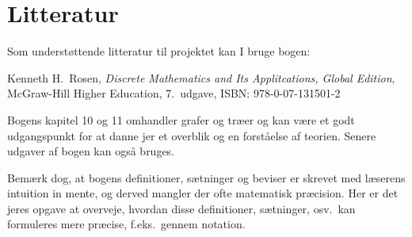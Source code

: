 \section{Litteratur}
\label{sec:literature}
Som understøttende litteratur til projektet kan I bruge bogen:
\begin{center}
  Kenneth H.\ Rosen,
  \emph{Discrete Mathematics and Its Applitcations, Global Edition},\\
  McGraw-Hill Higher Education,
  7.\ udgave,
  ISBN: 978-0-07-131501-2
\end{center}
Bogens kapitel 10 og 11 omhandler grafer og træer og kan være et godt udgangspunkt for at danne jer et overblik og en forståelse af teorien.
Senere udgaver af bogen kan også bruges.

Bemærk dog, at bogens definitioner, sætninger og beviser er skrevet med læserens intuition in mente, og derved mangler der ofte  matematisk præcision.
Her er det jeres opgave at overveje, hvordan disse definitioner, sætninger, osv.\ kan formuleres mere præcise, f.eks.\ gennem notation.
